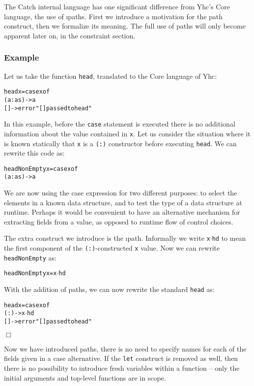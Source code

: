 \documentclass[preprint]{sigplanconf}
\newcommand{\T}[1]{\texttt{#1}}
\newcounter{exmp}
\newcommand{\yesexample}{\subsubsection*{Example \arabic{exmp}}\addtocounter{exmp}{1}}
\newcommand{\noexample}{\hfill$\Box$}
\newenvironment{code}{\begin{alltt}\small}{\end{alltt}}
\newcommand{\D}{\ensuremath{\cdot}} %
\begin{document}
The Catch internal language has one significant difference from Yhc's Core
language, the use of \i{paths}. First we introduce a motivation for the path
construct, then we formalize its meaning. The full use of paths will only
become apparent later on, in the constraint section.

\yesexample

Let us take the function \T{head}, translated to the Core language of Yhc:

\begin{code}
 head x = case x of
              (a:as) -> a
              [] -> error "[] passed to head"
\end{code}

In this example, before the \T{case} statement is executed there is no
additional information about the value contained in \T{x}. Let us consider the
situation where it is known statically that \T{x} is a \T{(:)} constructor
before executing \T{head}. We can rewrite this code as:

\begin{code}
 headNonEmpty x = case x of
                      (a:as) -> a
\end{code}

We are now using the case expression for two different purposes: to select the
elements in a known data structure, and to test the type of a data structure at
runtime. Perhaps it would be convenient to have an alternative mechanism for
extracting fields from a value, as opposed to runtime flow of control choices.

The extra construct we introduce is the \i{path}. Informally we write
\T{x\D{}hd} to mean the first component of the \T{(:)}-constructed \T{x} value.
Now we can rewrite \T{headNonEmpty} as:

\begin{code}
 headNonEmpty x = x\(\D\)hd
\end{code}

With the addition of paths, we can now rewrite the standard \T{head} as:

\begin{code}
 head x = case x of
            (:) -> x\(\D\)hd
            [] -> error "[] passed to head"
\end{code}

\noexample

Now we have introduced paths, there is no need to specify names for each of the
fields given in a case alternative. If the \T{let} construct is removed as
well, then there is no possibility to introduce fresh variables within a
function -- only the initial arguments and top-level functions are in scope.
\end{document}
